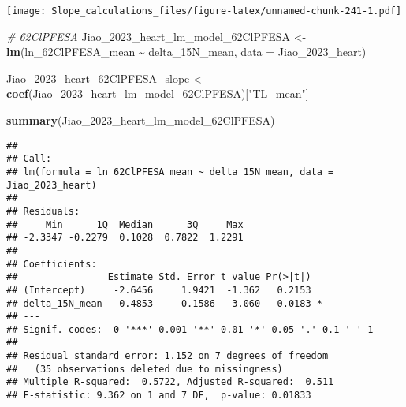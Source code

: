 \documentclass[
]{article}
\newenvironment{Shaded}{\begin{snugshade}}{\end{snugshade}}
\newcommand{\AttributeTok}[1]{\textcolor[rgb]{0.13,0.29,0.53}{#1}}
\newcommand{\CommentTok}[1]{\textcolor[rgb]{0.56,0.35,0.01}{\textit{#1}}}
\newcommand{\FunctionTok}[1]{\textcolor[rgb]{0.13,0.29,0.53}{\textbf{#1}}}
\newcommand{\NormalTok}[1]{#1}
\newcommand{\OtherTok}[1]{\textcolor[rgb]{0.56,0.35,0.01}{#1}}
\newcommand{\SpecialCharTok}[1]{\textcolor[rgb]{0.81,0.36,0.00}{\textbf{#1}}}
\newcommand{\StringTok}[1]{\textcolor[rgb]{0.31,0.60,0.02}{#1}}
\begin{document}
\texttt{[image: Slope\_calculations\_files/figure-latex/unnamed-chunk-241-1.pdf]}

\begin{Shaded}
\begin{Highlighting}[]
\CommentTok{\# 62ClPFESA}
\NormalTok{Jiao\_2023\_heart\_lm\_model\_62ClPFESA }\OtherTok{\textless{}{-}} \FunctionTok{lm}\NormalTok{(ln\_62ClPFESA\_mean }\SpecialCharTok{\textasciitilde{}}\NormalTok{ delta\_15N\_mean,}
                                    \AttributeTok{data =}\NormalTok{ Jiao\_2023\_heart)}

\NormalTok{Jiao\_2023\_heart\_62ClPFESA\_slope }\OtherTok{\textless{}{-}} \FunctionTok{coef}\NormalTok{(Jiao\_2023\_heart\_lm\_model\_62ClPFESA)[}\StringTok{"TL\_mean"}\NormalTok{]}

\FunctionTok{summary}\NormalTok{(Jiao\_2023\_heart\_lm\_model\_62ClPFESA)}
\end{Highlighting}
\end{Shaded}

\begin{verbatim}
## 
## Call:
## lm(formula = ln_62ClPFESA_mean ~ delta_15N_mean, data = Jiao_2023_heart)
## 
## Residuals:
##     Min      1Q  Median      3Q     Max 
## -2.3347 -0.2279  0.1028  0.7822  1.2291 
## 
## Coefficients:
##                Estimate Std. Error t value Pr(>|t|)  
## (Intercept)     -2.6456     1.9421  -1.362   0.2153  
## delta_15N_mean   0.4853     0.1586   3.060   0.0183 *
## ---
## Signif. codes:  0 '***' 0.001 '**' 0.01 '*' 0.05 '.' 0.1 ' ' 1
## 
## Residual standard error: 1.152 on 7 degrees of freedom
##   (35 observations deleted due to missingness)
## Multiple R-squared:  0.5722, Adjusted R-squared:  0.511 
## F-statistic: 9.362 on 1 and 7 DF,  p-value: 0.01833
\end{verbatim}
\end{document}
